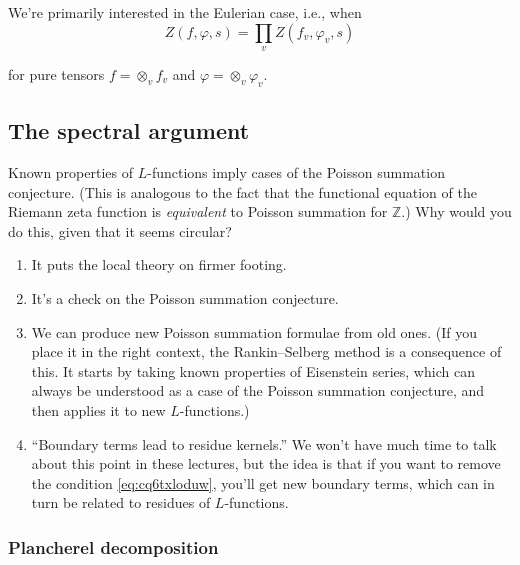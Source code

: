 \documentclass[reqno]{amsart} 
\numberwithin{theorem}{section}
\numberwithin{equation}{section}
\numberwithin{exercise}{section}
\begin{document}
We're primarily interested in the Eulerian case, i.e., when
\begin{equation*}
  Z(f, \varphi, s) = \prod_v Z(f_v, \varphi_v, s)
\end{equation*}

for pure tensors $f = \otimes_v f_v$ and $\varphi = \otimes_v \varphi_v$.

\subsection{The spectral argument}\label{sec:cq6txpqmpx}

Known properties of $L$-functions imply cases of the Poisson summation conjecture.  (This is analogous to the fact that the functional equation of the Riemann zeta function is \emph{equivalent} to Poisson summation for $\mathbb{Z}$.)  Why would you do this, given that it seems circular?
\begin{enumerate}
\item It puts the local theory on firmer footing.
\item It's a check on the Poisson summation conjecture.
\item We can produce new Poisson summation formulae from old ones.  (If you place it in the right context, the Rankin--Selberg method is a consequence of this.  It starts by taking known properties of Eisenstein series, which can always be understood as a case of the Poisson summation conjecture, and then applies it to new $L$-functions.)
\item ``Boundary terms lead to residue kernels.''  We won't have much time to talk about this point in these lectures, but the idea is that if you want to remove the condition \eqref{eq:cq6txloduw}, you'll get new boundary terms, which can in turn be related to residues of $L$-functions.
\end{enumerate}

\subsubsection{Plancherel decomposition}\label{sec:cq6txpqlp7}
\end{document}
